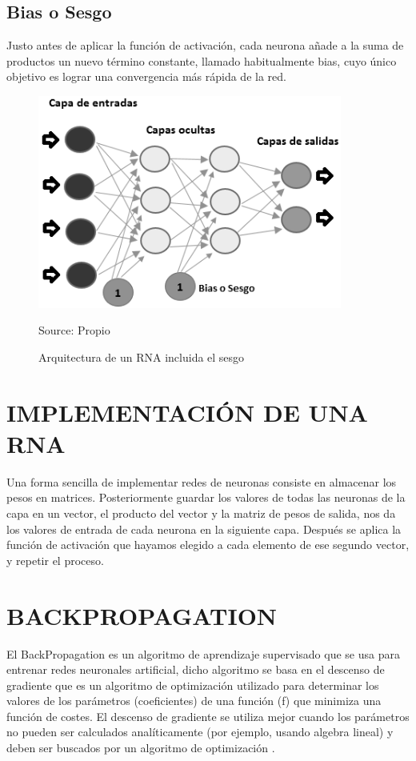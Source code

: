 \subsection{Bias o Sesgo}
Justo antes de aplicar la función de activación, cada neurona añade a la suma de
productos un nuevo término constante, llamado habitualmente bias, cuyo único objetivo
es lograr una convergencia más rápida de la red.


\begin{figure}[H]
		\centering
		\includegraphics[width=100mm]{./Imagenes/arquitectura_red_neuronal.png}
		\caption{Arquitectura de un RNA incluida el sesgo}
		Source: Propio
		\label{fig:arquitectura_red_neuronal}
\end{figure}

\section{IMPLEMENTACIÓN DE UNA RNA}
Una forma sencilla de implementar redes de neuronas consiste en almacenar los
pesos en matrices. Posteriormente guardar los valores de todas las neuronas de la capa en
un vector, el producto del vector y la matriz de pesos de salida, nos da los valores de
entrada de cada neurona en la siguiente capa. Después se aplica la función de activación
que hayamos elegido a cada elemento de ese segundo vector, y repetir el proceso.

\section{BACKPROPAGATION}
El BackPropagation es un algoritmo de aprendizaje supervisado que se usa para entrenar
redes neuronales artificial, dicho algoritmo se basa en el descenso de gradiente que es un
algoritmo de optimización utilizado para determinar los valores de los parámetros
(coeficientes) de una función (f) que minimiza una función de costes. El descenso de
gradiente se utiliza mejor cuando los parámetros no pueden ser calculados analíticamente
(por ejemplo, usando algebra lineal) y deben ser buscados por un algoritmo de
optimización \cite{27lehr1993backpropagation}.


